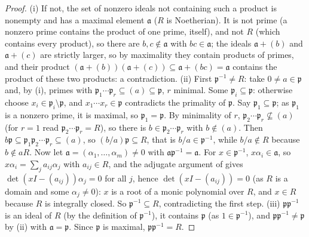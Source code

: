 \begin{proof}
(i) If not, the set of nonzero ideals not containing such a product is nonempty and has a maximal element $\mathfrak a$ ($R$ is Noetherian). It is not
prime (a nonzero prime contains the product of one prime, itself), and not $R$ (which contains every product), so there are $b,c\notin\mathfrak a$ with
$bc\in\mathfrak a$; the ideals $\mathfrak a+(b)$ and $\mathfrak a+(c)$ are strictly larger, so by maximality they contain products of primes, and their product
$(\mathfrak a+(b))(\mathfrak a+(c))\subseteq\mathfrak a+(bc)=\mathfrak a$ contains the product of these two products: a contradiction.
(ii) First $\mathfrak p^{-1}\ne R$: take $0\ne a\in\mathfrak p$ and, by (i), primes with $\mathfrak p_1\cdots\mathfrak p_r\subseteq(a)\subseteq\mathfrak p$, $r$
minimal. Some $\mathfrak p_i\subseteq\mathfrak p$: otherwise choose $x_i\in\mathfrak p_i\setminus\mathfrak p$, and $x_1\cdots x_r\in\mathfrak p$ contradicts the
primality of $\mathfrak p$. Say $\mathfrak p_1\subseteq\mathfrak p$; as $\mathfrak p_1$ is a nonzero prime, it is maximal, so $\mathfrak p_1=\mathfrak p$. By
minimality of $r$, $\mathfrak p_2\cdots\mathfrak p_r\not\subseteq(a)$ (for $r=1$ read $\mathfrak p_2\cdots\mathfrak p_r=R$), so there is $b\in\mathfrak p_2\cdots\mathfrak p_r$
with $b\notin(a)$. Then $b\mathfrak p\subseteq\mathfrak p_1\mathfrak p_2\cdots\mathfrak p_r\subseteq(a)$, so $(b/a)\mathfrak p\subseteq R$, that is
$b/a\in\mathfrak p^{-1}$, while $b/a\notin R$ because $b\notin aR$.
Now let $\mathfrak a=(\alpha_1,\dots,\alpha_m)\ne0$ with $\mathfrak a\mathfrak p^{-1}=\mathfrak a$. For $x\in\mathfrak p^{-1}$, $x\alpha_i\in\mathfrak a$, so
$x\alpha_i=\sum_ja_{ij}\alpha_j$ with $a_{ij}\in R$, and the adjugate argument of  gives $\det(xI-(a_{ij}))\alpha_j=0$ for all $j$, hence
$\det(xI-(a_{ij}))=0$ (as $R$ is a domain and some $\alpha_j\ne0$): $x$ is a root of a monic polynomial over $R$, and $x\in R$ because $R$ is integrally closed. So
$\mathfrak p^{-1}\subseteq R$, contradicting the first step. (iii) $\mathfrak p\mathfrak p^{-1}$ is an ideal of $R$ (by the definition of $\mathfrak p^{-1}$), it
contains $\mathfrak p$ (as $1\in\mathfrak p^{-1}$), and $\mathfrak p\mathfrak p^{-1}\ne\mathfrak p$ by (ii) with $\mathfrak a=\mathfrak p$. Since $\mathfrak p$ is
maximal, $\mathfrak p\mathfrak p^{-1}=R$.
\end{proof}

